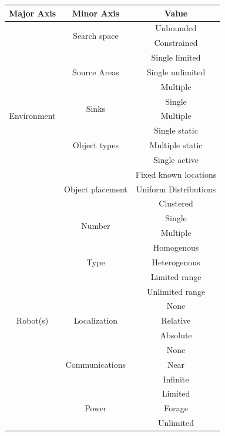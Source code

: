 \begin{tabular}{ | c | c | c |}
	\hline
	Major Axis & Minor Axis & Value  \\ \hline
	\multirow{13}{*}{Environment}
		& \multirow{2}{*}{Search space} 
			& Unbounded \\  
		& 	& Constrained \\ \cline{2-3}
		& \multirow{3}{*}{Source Areas} 
			& Single limited \\ 
		&	& Single unlimited \\
		&	& Multiple \\ \cline{2-3}
		& \multirow{2}{*}{Sinks} 
			& Single \\
		&	& Multiple \\ \cline{2-3}
		& \multirow{3}{*}{Object types} 
			& Single static \\
		&	& Multiple static \\
		&	& Single active \\ \cline{2-3}
		& \multirow{3}{*}{Object placement} 
			& Fixed known locations \\
		&	& Uniform Distributions \\
		&	& Clustered \\\hline
	\multirow{16}{*}{Robot(s)}
		& \multirow{2}{*}{Number} 
			& Single \\  
		& 	& Multiple \\ \cline{2-3}
		& \multirow{3}{*}{Type} 
			& Homogenous \\ 
		&	& Heterogenous \\ \cline{2-3}
		& \multirow{2}{*}{Object Sensing} 
			& Limited range \\
		&	& Unlimited range\\ \cline{2-3}
		& \multirow{3}{*}{Localization} 
			& None \\
		&	& Relative \\
		&	& Absolute \\ \cline{2-3}
		& \multirow{3}{*}{Communications} 
			& None \\
		&	& Near \\
		&	& Infinite \\\cline{2-3}
		& \multirow{3}{*}{Power} 
			& Limited \\
		&	& Forage \\
		&	& Unlimited \\\hline
\end{tabular}


